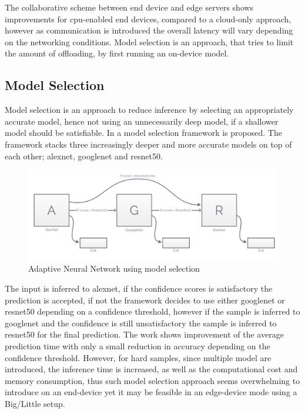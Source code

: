 The collaborative scheme between end device and edge servers shows improvements for \gls{cpu}-enabled end devices, compared to a cloud-only approach, however as communication is introduced the overall latency will vary depending on the networking conditions. Model selection is an approach, that tries to limit the amount of offloading, by first running an on-device model. 

\subsection{Model Selection}

Model selection is an approach to reduce inference by selecting an appropriately accurate model, hence not using an unnecessarily deep model, if a shallower model should be satisfiable. In \cite{bolukbasi_adaptive_2017} a model selection framework is proposed. The framework stacks three increasingly deeper and more accurate models on top of each other; \gls{alexnet}, \gls{googlenet} and \gls{resnet}50. 

\begin{figure}
	\centering
	\includegraphics[width=\linewidth]{figures/models/adaptive}
	\caption[Adaptive Neural Network]{Adaptive Neural Network using model selection}
\end{figure}

The input is inferred to \gls{alexnet}, if the confidence scores is satisfactory the prediction is accepted, if not the framework decides to use either \gls{googlenet} or \gls{resnet}50 depending on a confidence threshold, however if the sample is inferred to \gls{googlenet} and the confidence is still unsatisfactory the sample is inferred to \gls{resnet}50 for the final prediction. The work shows improvement of the average prediction time with only a small reduction in accuracy depending on the confidence threshold. However, for hard samples, since multiple model are introduced, the inference time is increased, as well as the computational cost and memory consumption, thus such model selection approach seems overwhelming to introduce on an end-device yet it may be feasible in an edge-device mode using a Big/Little setup.

